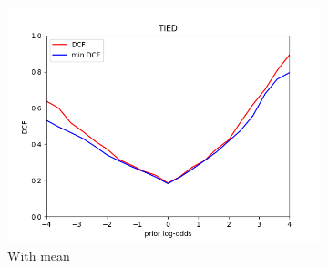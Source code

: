 \begin{figure}[h!]
\begin{subfigure}[b]{0.4\linewidth}
        \includegraphics[width=\linewidth]{Lab/07. Lab 07/Images/03. Tied}
        \caption{With mean}
        \label{fig:dcfTC}
    \end{subfigure}
    \caption{}
    \label{fig:dcfMVGNBTC}
\end{figure}
